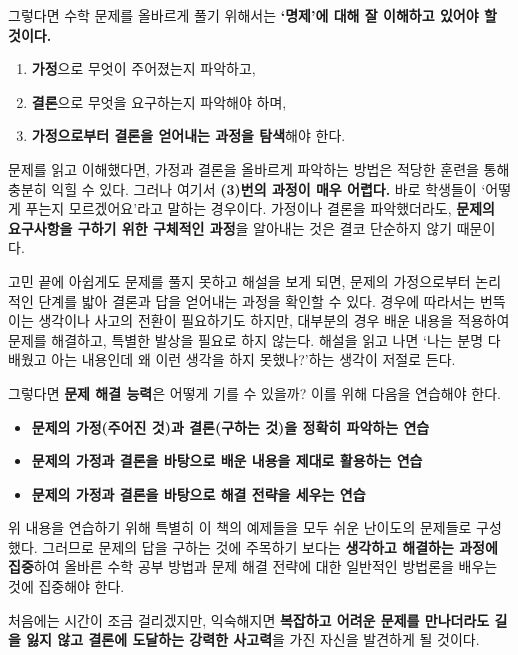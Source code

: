 \bigskip

\pagebreak

그렇다면 수학 문제를 올바르게 풀기 위해서는 \textbf{`명제'에 대해 잘 이해하고 있어야 할 것이다.}

\begin{enumerate}
    \item \textbf{가정}으로 무엇이 주어졌는지 파악하고,
    \item \textbf{결론}으로 무엇을 요구하는지 파악해야 하며,
    \item \textbf{가정으로부터 결론을 얻어내는 과정을 탐색}해야 한다.
\end{enumerate}

문제를 읽고 이해했다면, 가정과 결론을 올바르게 파악하는 방법은 적당한 훈련을 통해 충분히 익힐 수 있다. 그러나 여기서 \textbf{(3)번의 과정이 매우 어렵다.} 바로 학생들이 `어떻게 푸는지 모르겠어요'라고 말하는 경우이다. 가정이나 결론을 파악했더라도, \textbf{문제의 요구사항을 구하기 위한 구체적인 과정}을 알아내는 것은 결코 단순하지 않기 때문이다.

\medskip

고민 끝에 아쉽게도 문제를 풀지 못하고 해설을 보게 되면, 문제의 가정으로부터 논리적인 단계를 밟아 결론과 답을 얻어내는 과정을 확인할 수 있다. 경우에 따라서는 번뜩이는 생각이나 사고의 전환이 필요하기도 하지만, 대부분의 경우 배운 내용을 적용하여 문제를 해결하고, 특별한 발상을 필요로 하지 않는다. 해설을 읽고 나면 `나는 분명 다 배웠고 아는 내용인데 왜 이런 생각을 하지 못했나?'하는 생각이 저절로 든다.

\medskip

그렇다면 \textbf{문제 해결 능력}은 어떻게 기를 수 있을까? 이를 위해 다음을 연습해야 한다.
\begin{itemize}
    \item \textbf{문제의 가정(주어진 것)과 결론(구하는 것)을 정확히 파악하는 연습}
    \item \textbf{문제의 가정과 결론을 바탕으로 배운 내용을 제대로 활용하는 연습}
    \item \textbf{문제의 가정과 결론을 바탕으로 해결 전략을 세우는 연습}
\end{itemize}
위 내용을 연습하기 위해 특별히 이 책의 예제들을 모두 쉬운 난이도의 문제들로 구성했다. 그러므로 문제의 답을 구하는 것에 주목하기 보다는 \textbf{생각하고 해결하는 과정에 집중}하여 올바른 수학 공부 방법과 문제 해결 전략에 대한 일반적인 방법론을 배우는 것에 집중해야 한다.

\medskip

처음에는 시간이 조금 걸리겠지만, 익숙해지면 \textbf{복잡하고 어려운 문제를 만나더라도 길을 잃지 않고 결론에 도달하는 강력한 사고력}을 가진 자신을 발견하게 될 것이다.

\pagebreak
